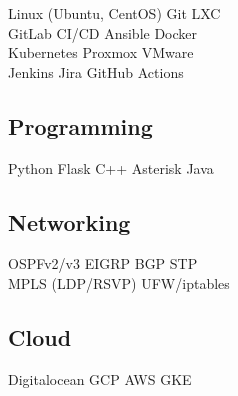\documentclass[letterpaper]{deedy-resume} %
\begin{document}
\begin{minipage}[t]{0.33\textwidth}
Linux (Ubuntu, CentOS) \textbullet{} Git \textbullet{}  LXC \\
GitLab CI/CD \textbullet{}  Ansible \textbullet{}  Docker \\ 
Kubernetes \textbullet{}  Proxmox \textbullet{}  VMware \\
Jenkins \textbullet{} Jira \textbullet{} GitHub Actions

\sectionspace %


\subsection{Programming}

Python \textbullet{} Flask \textbullet{} C++ \textbullet{} Asterisk \textbullet{}  Java \\ 
 
\sectionspace %

\subsection{Networking}

OSPFv2/v3 \textbullet{} EIGRP \textbullet{} BGP \textbullet{} STP \\ 
MPLS (LDP/RSVP) \textbullet{} UFW/iptables

\sectionspace %

\subsection{Cloud}

Digitalocean \textbullet{} GCP \textbullet{} AWS \textbullet{} GKE \\

\sectionspace %



\end{minipage} %
\hfill
%
%
\end{document}

